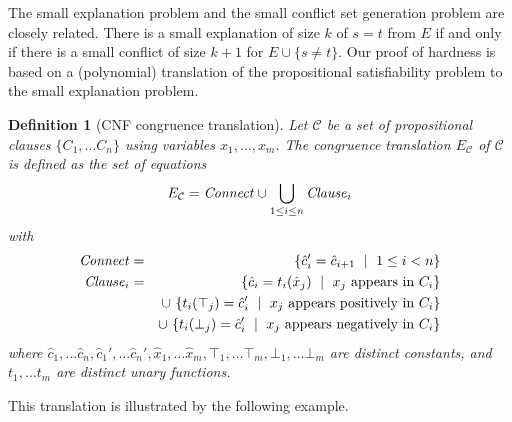 \documentclass{easychair}
\newtheorem{definition}{Definition}
\begin{document}
\noindent The small explanation problem and the small conflict set generation
problem are closely related.  There is a small explanation of size $k$ of $s=t$
from $E$ if and only if there is a small conflict of size $k+1$ for $E \cup
\{s\neq t\}$.  Our proof of hardness is based on a (polynomial) translation of
the propositional satisfiability problem to the small explanation problem.

\newcommand{\Assignment}{{\it Assignment}}
\newcommand{\Clause}{{\it Clause}}
\newcommand{\Connect}{{\it Connect}}

\begin{definition}[CNF congruence translation]

Let $\mathcal{C}$ be a set of propositional clauses $\{C_1,\ldots C_n\}$ using variables $x_1,\ldots,x_m$.
The \emph{congruence translation} $E_{\mathcal{C}}$ of\/ $\mathcal{C}$ is defined as the set of equations
\begin{equation*}
E_{\mathcal{C}} = \Connect \cup \bigcup_{1 \leq i \leq n}\Clause_i 
\end{equation*}
with
\begin{eqnarray*}
	\Connect &=& \{ \hat{c}_{i}' = \hat{c}_{i+1} \ \mid\ 1 \leq i < n\}\\
        \Clause_i &=& \{ \hat{c}_i = t_i(\hat{x}_j) \ \mid\ x_j \text{ appears in } C_i \}\\
           & & \cup\ \{ t_i(\top_j) = \hat{c}_i' \ \mid\ x_j \text{ appears positively in } C_i \}\\
           & & \cup\ \{ t_i(\bot_j) = \hat{c}_i' \ \mid\ x_j \text{ appears negatively in } C_i \}
\end{eqnarray*}
where $\hat{c}_{1},\dots \hat{c}_{n},\hat{c}_{1}', \dots \hat{c}_{n}',
\hat{x}_1, \dots \hat{x}_m, \top_1, \dots \top_m, \bot_1, \dots \bot_m$ are distinct constants, and $t_1, \dots t_m$ are
distinct unary functions.

\end{definition}

\noindent This translation is illustrated by the following example.
\end{document}
